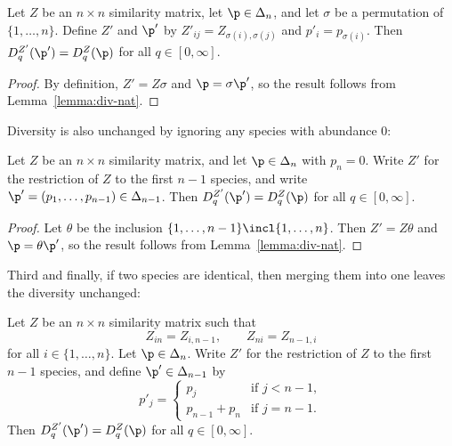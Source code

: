 \begin{lemma}[Symmetry]
% 
Let $Z$ be an $n \times n$ similarity matrix, let $\p \in \Delta_n$, and
let $\sigma$ be a permutation of $\{1, \ldots, n\}$.  Define $Z'$ and $\p'$
by $Z'_{ij} = Z_{\sigma(i), \sigma(j)}$ and $p'_i = p_{\sigma(i)}$.  Then
$D_q^{Z'}(\p') = D_q^Z(\p)$ for all $q \in [0, \infty]$.  
\end{lemma}

\begin{proof}
By definition, $Z' = Z\sigma$ and $\p = \sigma\p'$, so the result follows
from Lemma~\ref{lemma:div-nat}.
\end{proof}

Diversity is also unchanged by ignoring any species with abundance $0$:

\begin{lemma}
% 
Let $Z$ be an $n \times n$ similarity matrix, and let $\p \in \Delta_n$ with
$p_n = 0$.  Write $Z'$ for the restriction of $Z$ to the first $n - 1$
species, and write $\p' = (p_1, \ldots, p_{n - 1}) \in \Delta_{n - 1}$.
Then $D_q^{Z'}(\p') = D_q^Z(\p)$ for all $q \in [0, \infty]$. 
\end{lemma}

\begin{proof}
Let $\theta$ be the inclusion $\{1, \ldots, n - 1\} \incl \{1, \ldots,
n\}$.  Then $Z' = Z\theta$ and $\p = \theta\p'$, so the result follows from
Lemma~\ref{lemma:div-nat}. 
\end{proof}

Third and finally, if two species are identical, then merging them into one
leaves the diversity unchanged:

\begin{lemma}
%
%
% 
Let $Z$ be an $n \times n$ similarity matrix such that
\[
Z_{in} = Z_{i, n - 1}, 
\qquad
Z_{ni} = Z_{n - 1, i}
\]
for all $i \in \{1, \ldots, n\}$.  Let $\p \in \Delta_n$.  Write $Z'$ for
the restriction of $Z$ to the first $n - 1$ species, and define $\p' \in
\Delta_{n - 1}$ by
\[
p'_j
=
\begin{cases}
p_j             &\text{if } j < n - 1,  \\
p_{n - 1} + p_n &\text{if } j = n - 1.
\end{cases}
\]
Then $D_q^{Z'}(\p') = D_q^Z(\p)$ for all $q \in [0, \infty]$.
\end{lemma}

